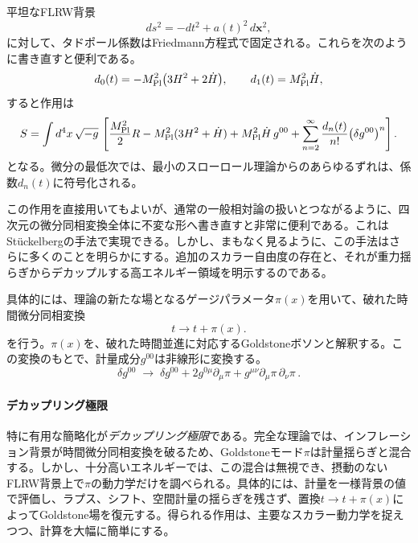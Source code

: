 \documentclass[a4paper,11pt,oneside]{article}
\theoremstyle{definition}
\numberwithin{equation}{section}
\begin{document}
平坦なFLRW背景
\begin{equation}
ds^2=-dt^2+a(t)^2\,d\mathbf x^2 ,
\end{equation}
に対して、タドポール係数はFriedmann方程式で固定される。これらを次のように書き直すと便利である。
\begin{equation}
d_0(t)=-M_{\rm Pl}^2\bigl(3H^2+2\dot H\bigr),
\qquad
d_1(t)=M_{\rm Pl}^2\dot H ,
\end{equation}
すると作用は
\begin{equation}\label{EFTI-unitary-standard}
S
=
\int d^4x\,\sqrt{-g}\,
\left[
\frac{M_{\rm Pl}^2}{2}R
-M_{\rm Pl}^2(3H^2+\dot H)
+M_{\rm Pl}^2\dot H\,g^{00}
+\sum_{n=2}^{\infty}\frac{d_n(t)}{n!}\bigl(\delta g^{00}\bigr)^n
\right] .
\end{equation}
となる。微分の最低次では、最小のスローロール理論からのあらゆるずれは、係数\(d_n(t)\)に符号化される。



この作用を直接用いてもよいが、通常の一般相対論の扱いとつながるように、四次元の微分同相変換全体に不変な形へ書き直すと非常に便利である。これはSt\"uckelbergの手法で実現できる。しかし、まもなく見るように、この手法はさらに多くのことを明らかにする。追加のスカラー自由度の存在と、それが重力揺らぎからデカップルする高エネルギー領域を明示するのである。



具体的には、理論の新たな場となるゲージパラメータ$  \pi(x) $を用いて、破れた時間微分同相変換
\begin{equation}
t\to t+\pi(x) .
\end{equation}
を行う。\(\pi(x)\)を、破れた時間並進に対応するGoldstoneボソンと解釈する。この変換のもとで、計量成分\(g^{00}\)は非線形に変換する。
\begin{equation}\label{Deltadeltag00}
\delta g^{00}
\;\to\;
\delta g^{00}
+2g^{0\mu}\partial_\mu \pi
+g^{\mu\nu}\partial_\mu \pi\,\partial_\nu \pi\,.
\end{equation}


\paragraph{デカップリング極限} 特に有用な簡略化が\emph{デカップリング極限}である。完全な理論では、インフレーション背景が時間微分同相変換を破るため、Goldstoneモード\(\pi\)は計量揺らぎと混合する。しかし、十分高いエネルギーでは、この混合は無視でき、摂動のないFLRW背景上で\(\pi\)の動力学だけを調べられる。具体的には、計量を一様背景の値で評価し、ラプス、シフト、空間計量の揺らぎを残さず、置換\(t\to t+\pi(x)\)によってGoldstone場を復元する。得られる作用は、主要なスカラー動力学を捉えつつ、計算を大幅に簡単にする。
\end{document}
